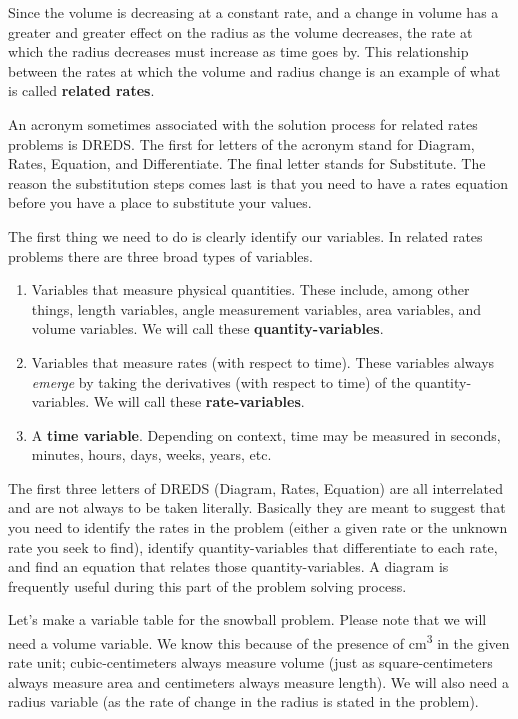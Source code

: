 \documentclass[10pt,oneside,]{book}
\newcommand{\terminology}[1]{\textbf{#1}}
\newcommand{\acronym}[1]{#1}
\theoremstyle{plain}
\theoremstyle{definition}
\numberwithin{equation}{section}
\begin{document}
\par
Since the volume is decreasing at a constant rate, and a change in volume has a greater and greater effect on the radius as the volume decreases, the rate at which the radius decreases must increase as time goes by. This relationship between the rates at which the volume and radius change is an example of what is called \terminology{related rates}.%
\par
An acronym sometimes associated with the solution process for related rates problems is \acronym{DREDS}. The first for letters of the acronym stand for Diagram, Rates, Equation, and Differentiate. The final letter stands for Substitute. The reason the substitution steps comes last is that you need to have a rates equation before you have a place to substitute your values.%
\par
The first thing we need to do is clearly identify our variables. In related rates problems there are three broad types of variables.%
\begin{enumerate}
\item{}Variables that measure physical quantities. These include, among other things, length variables, angle measurement variables, area variables, and volume variables. We will call these \terminology{quantity-variables}.\item{}Variables that measure rates (with respect to time). These variables always \emph{emerge} by taking the derivatives (with respect to time) of the quantity-variables. We will call these \terminology{rate-variables}.\item{}A \terminology{time variable}. Depending on context, time may be measured in seconds, minutes, hours, days, weeks, years, etc.\@\end{enumerate}
\par
The first three letters of \acronym{DREDS} (Diagram, Rates, Equation) are all interrelated and are not always to be taken literally. Basically they are meant to suggest that you need to identify the rates in the problem (either a given rate or the unknown rate you seek to find), identify quantity-variables that differentiate to each rate, and find an equation that relates those quantity-variables. A diagram is frequently useful during this part of the problem solving process.%
\par
Let's make a variable table for the snowball problem. Please note that we will need a volume variable. We know this because of the presence of \si{\centi\meter\tothe{3}} in the given rate unit; cubic-centimeters always measure volume (just as square-centimeters always measure area and centimeters always measure length). We will also need a radius variable (as the rate of change in the radius is stated in the problem).%
\end{document}
